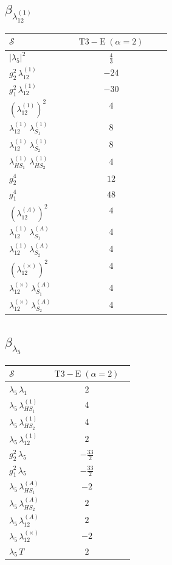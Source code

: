 \documentclass[9pt]{article}
\begin{document}
\subsection*{$ \beta_{\lambda_{12}^{(1)}} $}
\begin{longtable}{@{}p{0.31\linewidth}c@{}}
\toprule
$\mathcal{S}$ & $ \mathrm{T3-E}\;(\alpha=2) $ \\
\midrule
$ |\lambda_5|^2 $ & $ \frac{4}{3} $ \\
$ g_2^2\,\lambda_{12}^{(1)} $ & $ -24 $ \\
$ g_1^2\,\lambda_{12}^{(1)} $ & $ -30 $ \\
$ \left(\lambda_{12}^{(1)}\right)^2 $ & $ 4 $ \\
$ \lambda_{12}^{(1)}\,\lambda_{S_1}^{(1)} $ & $ 8 $ \\
$ \lambda_{12}^{(1)}\,\lambda_{S_2}^{(1)} $ & $ 8 $ \\
$ \lambda_{HS_1}^{(1)}\,\lambda_{HS_2}^{(1)} $ & $ 4 $ \\
$ g_2^4 $ & $ 12 $ \\
$ g_1^4 $ & $ 48 $ \\
$ \left(\lambda_{12}^{(A)}\right)^2 $ & $ 4 $ \\
$ \lambda_{12}^{(1)}\,\lambda_{S_1}^{(A)} $ & $ 4 $ \\
$ \lambda_{12}^{(1)}\,\lambda_{S_2}^{(A)} $ & $ 4 $ \\
$ \left(\lambda_{12}^{(\times)}\right)^2 $ & $ 4 $ \\
$ \lambda_{12}^{(\times)}\,\lambda_{S_1}^{(A)} $ & $ 4 $ \\
$ \lambda_{12}^{(\times)}\,\lambda_{S_2}^{(A)} $ & $ 4 $ \\
\bottomrule
\end{longtable}
\subsection*{$ \beta_{\lambda_5} $}
\begin{longtable}{@{}p{0.31\linewidth}c@{}}
\toprule
$\mathcal{S}$ & $ \mathrm{T3-E}\;(\alpha=2) $ \\
\midrule
$ \lambda_5\,\lambda_1 $ & $ 2 $ \\
$ \lambda_5\,\lambda_{HS_1}^{(1)} $ & $ 4 $ \\
$ \lambda_5\,\lambda_{HS_2}^{(1)} $ & $ 4 $ \\
$ \lambda_5\,\lambda_{12}^{(1)} $ & $ 2 $ \\
$ g_2^2\,\lambda_5 $ & $ - \frac{33}{2} $ \\
$ g_1^2\,\lambda_5 $ & $ - \frac{33}{2} $ \\
$ \lambda_5\,\lambda_{HS_1}^{(A)} $ & $ -2 $ \\
$ \lambda_5\,\lambda_{HS_2}^{(A)} $ & $ 2 $ \\
$ \lambda_5\,\lambda_{12}^{(A)} $ & $ 2 $ \\
$ \lambda_5\,\lambda_{12}^{(\times)} $ & $ -2 $ \\
$ \lambda_5\,T $ & $ 2 $ \\
\bottomrule
\end{longtable}
\end{document}
